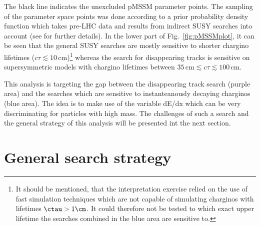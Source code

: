 The black line indicates the unexcluded pMSSM parameter points.
The sampling of the parameter space points was done according to a prior probability density function which takes pre-LHC data and results from indirect SUSY searches into account (see \cite{bib:CMS:HSCPReinterpreation_PAS} for further details).
In the lower part of Fig.~\ref{fig:pMSSMplot}, it can be seen that the general SUSY searches are mostly sensitive 
to shorter chargino lifetimes ($c\tau \lesssim 10 \,\text{cm}$)\footnote{It should be mentioned, that the interpretation exercise relied on the use of fast simulation techniques which are not capable of simulating charginos with lifetimes $\ctau>1\cm$. It could therefore not be tested to which exact upper lifetime the searches combined in the blue area are sensitive to.}
whereas the search for disappearing tracks is sensitive on supersymmetric models with chargino lifetimes between $35\,\text{cm} \lesssim c\tau \lesssim 100\,\text{cm}$.

This analysis is targeting the gap between the disappearing track search (purple area) and the searches which are sensitive to instanteanously decaying charginos (blue area). 
The idea is to make use of the variable dE/dx which can be very discriminating for particles with high mass.
The challenges of such a search and the general strategy of this analysis will be presented int the next section.

\section{General search strategy}
\label{sec:GeneralSearchStrategy}


